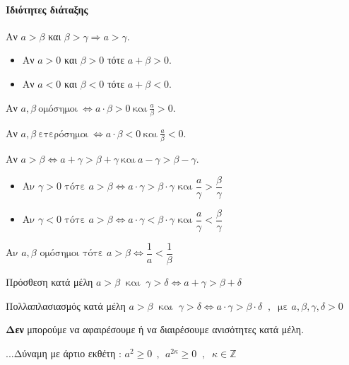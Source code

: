 \paragraph{Ιδιότητες διάταξης}
\begin{alist}
\begin{multicols}{2}
\item Αν $ a>\beta $ και $ \beta>\gamma \Rightarrow a>\gamma $.
\item 
\begin{itemize}
\item Αν $ a>0 $ και $ \beta>0 $ τότε $ a+\beta>0 $.
\item Αν $ a<0 $ και $ \beta<0 $ τότε $ a+\beta<0 $.
\end{itemize}
\item Αν $ a,\beta\ \textrm{ομόσημοι}\ \Leftrightarrow a\cdot\beta>0\ \textrm{και}\ \frac{a}{\beta}>0 $.
\item Αν $ a,\beta\ \textrm{ετερόσημοι}\ \Leftrightarrow a\cdot\beta<0\ \textrm{και}\ \frac{a}{\beta}<0 $.
\item Αν $ a>\beta\Leftrightarrow a+\gamma>\beta+\gamma\ \textrm{και}\ a-\gamma>\beta-\gamma $.
\end{multicols}
\item 
\begin{itemize}
\item $ \textrm{Αν }\gamma>0\textrm{ τότε }a>\beta\Leftrightarrow a\cdot\gamma>\beta\cdot\gamma\textrm{ και }\dfrac{a}{\gamma}>\dfrac{\beta}{\gamma} $
\item $ \textrm{Αν }\gamma<0\textrm{ τότε }a>\beta\Leftrightarrow a\cdot\gamma<\beta\cdot\gamma\textrm{ και }\dfrac{a}{\gamma}<\dfrac{\beta}{\gamma} $
\end{itemize}
\item $ \textrm{Αν }a,\beta\textrm{ ομόσημοι τότε } a>\beta\Leftrightarrow \dfrac{1}{a}<\dfrac{1}{\beta} $
\item Πρόσθεση κατά μέλη  $a>\beta\;\;\textrm{και}\;\;\gamma>\delta\Leftrightarrow a+\gamma>\beta+\delta$
\item Πολλαπλασιασμός κατά μέλη
 $a>\beta\;\;\textrm{και}\;\;\gamma>\delta\Leftrightarrow a\cdot\gamma>\beta\cdot\delta\;\;,\;\;\textrm{με }a,\beta,\gamma,\delta>0$
\item \textbf{Δεν} μπορούμε να αφαιρέσουμε ή να διαιρέσουμε ανισότητες κατά μέλη.
\end{alist}
...Δύναμη με άρτιο εκθέτη : $a^2\geq0\ \ ,\ \ a^{2\kappa}\geq0\;\;,\;\;\kappa\in\mathbb{Z}$
